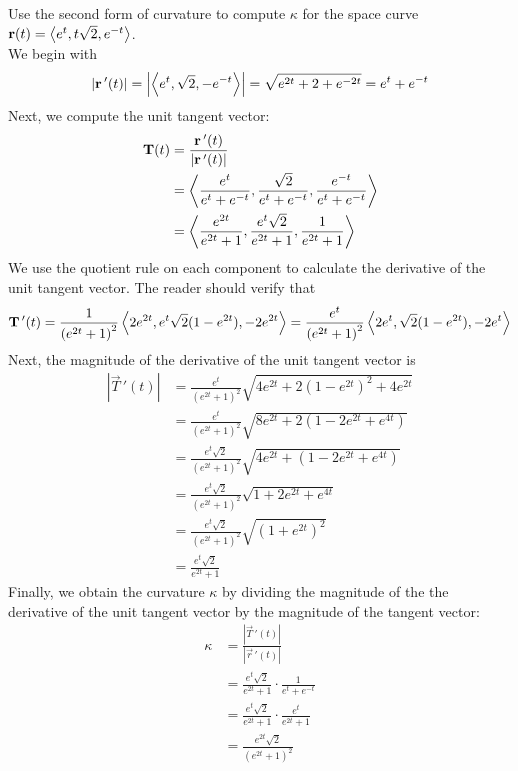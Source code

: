 \documentclass[handout]{ximera}
\begin{document}
\begin{example}[Example 4]
Use the second form of curvature to compute $\kappa$ for the space curve $\mathbf r(t) = \left\langle e^t, t\sqrt 2 , e^{-t}\right\rangle$.\\
We begin with
\[
|\mathbf r\,'(t)| = \left|\left\langle e^t, \sqrt 2 , -e^{-t}\right\rangle\right| = \sqrt{e^{2t} + 2 + e^{-2t}} = e^t + e^{-t}
\]
Next, we compute the unit tangent vector:
\begin{align*}
\mathbf T(t) &= \frac{\mathbf r\,'(t)}{|\mathbf r\,'(t)|}\\
             &= \left\langle \frac{e^t}{e^t + e^{-t}}, \frac{\sqrt 2}{e^t + e^{-t}} , \frac{e^{-t}}{e^t + e^{-t}}\right\rangle\\
             &= \left\langle \frac{e^{2t}}{e^{2t} + 1}, \frac{e^t\sqrt 2}{e^{2t} + 1} , \frac{1}{e^{2t} + 1}\right\rangle\\
\end{align*}
We use the quotient rule on each component to calculate the derivative of the unit tangent vector. The reader should verify that
\[
\mathbf T\,'(t) = \frac{1}{\left(e^{2t} +1\right)^2} \left\langle 2e^{2t}, e^t\sqrt 2 (1 - e^{2t}), -2e^{2t}\right\rangle = \frac{e^t}{\left(e^{2t} +1\right)^2} \left\langle 2e^{t}, \sqrt 2 (1 - e^{2t}), -2e^{t}\right\rangle
\]
Next, the magnitude of the derivative of the unit tangent vector is
\begin{align*}
\left|\vec T\,'(t)\right| &= \frac{e^t}{\left(e^{2t} +1\right)^2} \sqrt{4e^{2t} + 2 (1 - e^{2t})^2 + 4e^{2t}}\\
          &= \frac{e^t}{\left(e^{2t} +1\right)^2} \sqrt{8e^{2t} + 2 (1 -2e^{2t}+ e^{4t})}\\
        &= \frac{e^t \sqrt 2}{\left(e^{2t} +1\right)^2} \sqrt{4e^{2t} +  (1 -2e^{2t}+ e^{4t})}\\
          &= \frac{e^t \sqrt 2}{\left(e^{2t} +1\right)^2} \sqrt{1 +2e^{2t}+ e^{4t}}\\
          &= \frac{e^t \sqrt 2}{\left(e^{2t} +1\right)^2} \sqrt{(1 +e^{2t})^2}\\
            &= \frac{e^t \sqrt 2}{e^{2t} +1}
\end{align*}
Finally, we obtain the curvature $\kappa$ by dividing the magnitude of the the derivative of the unit tangent vector by the magnitude of the tangent vector:
\begin{align*}
\kappa &= \frac{|\vec T\,'(t)|}{|\vec r\,'(t)|}\\
       &= \frac{e^t \sqrt 2}{e^{2t} +1} \cdot \frac{1}{e^t + e^{-t}}\\
      &= \frac{e^t \sqrt 2}{e^{2t} +1} \cdot \frac{e^t}{e^{2t} + 1}\\
     &= \frac{e^{2t} \sqrt 2}{\left(e^{2t} +1\right)^2}
\end{align*}
\end{example}
\end{document}
